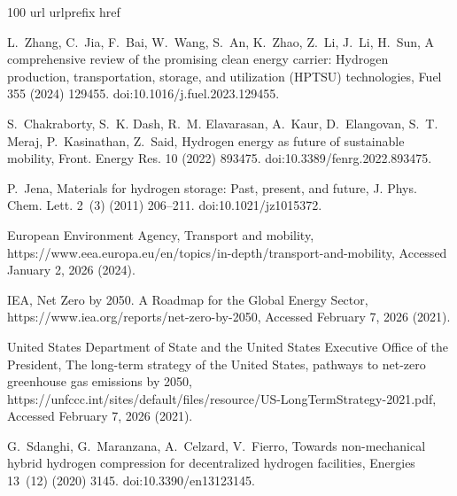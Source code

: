 \documentclass[review]{elsarticle}
\begin{document}

%

\begin{thebibliography}{100}
\expandafter\ifx\csname url\endcsname\relax
  \def\url#1{\texttt{#1}}\fi
\expandafter\ifx\csname urlprefix\endcsname\relax\def\urlprefix{URL }\fi
\expandafter\ifx\csname href\endcsname\relax
  \def\href#1#2{#2} \def\path#1{#1}\fi

L.~Zhang, C.~Jia, F.~Bai, W.~Wang, S.~An, K.~Zhao, Z.~Li, J.~Li, H.~Sun, A
  comprehensive review of the promising clean energy carrier: Hydrogen
  production, transportation, storage, and utilization {(HPTSU)} technologies,
  Fuel 355 (2024) 129455.
\newblock \href {https://doi.org/10.1016/j.fuel.2023.129455}
  {\path{doi:10.1016/j.fuel.2023.129455}}.

S.~Chakraborty, S.~K. Dash, R.~M. Elavarasan, A.~Kaur, D.~Elangovan, S.~T.
  Meraj, P.~Kasinathan, Z.~Said, Hydrogen energy as future of sustainable
  mobility, Front. Energy Res. 10 (2022) 893475.
\newblock \href {https://doi.org/10.3389/fenrg.2022.893475}
  {\path{doi:10.3389/fenrg.2022.893475}}.

P.~Jena, Materials for hydrogen storage: Past, present, and future, J. Phys.
  Chem. Lett. 2~(3) (2011) 206--211.
\newblock \href {https://doi.org/10.1021/jz1015372}
  {\path{doi:10.1021/jz1015372}}.

{European Environment Agency}, Transport and mobility,
  https://www.eea.europa.eu/en/topics/in-depth/transport-and-mobility,
  {Accessed January 2, 2026} (2024).

{IEA}, {Net Zero by 2050. A Roadmap for the Global Energy Sector},
  https://www.iea.org/reports/net-zero-by-2050, {Accessed February 7, 2026}
  (2021).

{United States Department of State and the United States Executive Office of
  the President}, The long-term strategy of the {U}nited {S}tates, pathways to
  net-zero greenhouse gas emissions by 2050,
  https://unfccc.int/sites/default/files/resource/US-LongTermStrategy-2021.pdf,
  {Accessed February 7, 2026} (2021).

G.~Sdanghi, G.~Maranzana, A.~Celzard, V.~Fierro, Towards non-mechanical hybrid
  hydrogen compression for decentralized hydrogen facilities, Energies 13~(12)
  (2020) 3145.
\newblock \href {https://doi.org/10.3390/en13123145}
  {\path{doi:10.3390/en13123145}}.


\end{thebibliography}
\end{document}
